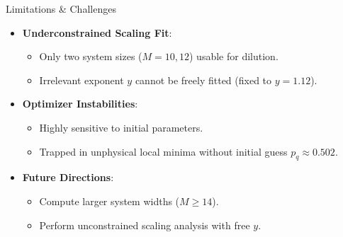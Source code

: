 \documentclass[10pt,aspectratio=169]{beamer}
\begin{document}
\begin{frame}{Limitations \& Challenges}
  \begin{itemize}
    \item \textbf{Underconstrained Scaling Fit}:
      \begin{itemize}
        \item Only two system sizes ($M=10, 12$) usable for dilution.
        \item Irrelevant exponent $y$ cannot be freely fitted (fixed to $y=1.12$).
      \end{itemize}
    \vspace{0.3cm}
    \item \textbf{Optimizer Instabilities}:
      \begin{itemize}
        \item Highly sensitive to initial parameters.
        \item Trapped in unphysical local minima without initial guess $p_q \approx 0.502$.
      \end{itemize}
    \vspace{0.3cm}
    \item \textbf{Future Directions}:
      \begin{itemize}
        \item Compute larger system widths ($M \ge 14$).
        \item Perform unconstrained scaling analysis with free $y$.
      \end{itemize}
  \end{itemize}
\end{frame}
\end{document}
